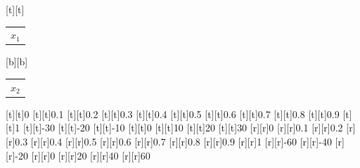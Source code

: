 %    
%
%
\begin{psfrags}%
\psfragscanon%
%
[t][t]{\begin{tabular}{c}$x_1$\end{tabular}}%
[b][b]{\begin{tabular}{c}$x_2$\end{tabular}}%
%
[t][t]{0}%
[t][t]{0.1}%
[t][t]{0.2}%
[t][t]{0.3}%
[t][t]{0.4}%
[t][t]{0.5}%
[t][t]{0.6}%
[t][t]{0.7}%
[t][t]{0.8}%
[t][t]{0.9}%
[t][t]{1}%
[t][t]{-30}%
[t][t]{-20}%
[t][t]{-10}%
[t][t]{0}%
[t][t]{10}%
[t][t]{20}%
[t][t]{30}%
%
[r][r]{0}%
[r][r]{0.1}%
[r][r]{0.2}%
[r][r]{0.3}%
[r][r]{0.4}%
[r][r]{0.5}%
[r][r]{0.6}%
[r][r]{0.7}%
[r][r]{0.8}%
[r][r]{0.9}%
[r][r]{1}%
[r][r]{-60}%
[r][r]{-40}%
[r][r]{-20}%
[r][r]{0}%
[r][r]{20}%
[r][r]{40}%
[r][r]{60}%
%
%
\end{psfrags}%
%
